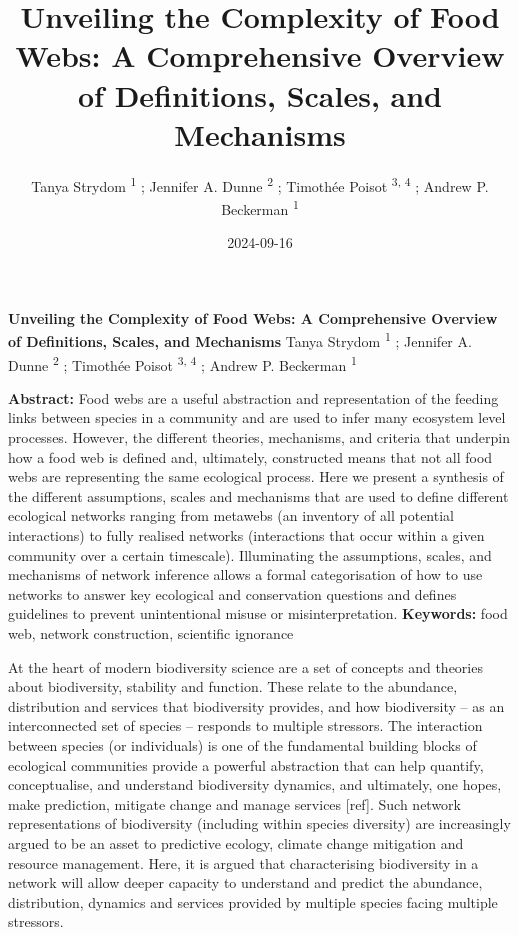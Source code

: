 \documentclass[
]{article}
\title{Unveiling the Complexity of Food Webs: A Comprehensive Overview
of Definitions, Scales, and Mechanisms}
\author{Tanya Strydom %
%
\textsuperscript{%
%
1%
}%
; Jennifer A. Dunne %
%
\textsuperscript{%
%
2%
}%
; Timothée Poisot %
%
\textsuperscript{%
3,%
4%
}%
; Andrew P. Beckerman %
%
\textsuperscript{%
%
1%
}%
}
\date{2024-09-16}
\begin{document}
\thispagestyle{empty}
{\bfseries\sffamily\Large Unveiling the Complexity of Food Webs: A
Comprehensive Overview of Definitions, Scales, and Mechanisms}
\vfil
Tanya Strydom %
%
\textsuperscript{%
%
1%
}%
; Jennifer A. Dunne %
%
\textsuperscript{%
%
2%
}%
; Timothée Poisot %
%
\textsuperscript{%
3,%
4%
}%
; Andrew P. Beckerman %
%
\textsuperscript{%
%
1%
}%

\vfil
{\small
\textbf{Abstract:} Food webs are a useful abstraction and representation
of the feeding links between species in a community and are used to
infer many ecosystem level processes. However, the different theories,
mechanisms, and criteria that underpin how a food web is defined and,
ultimately, constructed means that not all food webs are representing
the same ecological process. Here we present a synthesis of the
different assumptions, scales and mechanisms that are used to define
different ecological networks ranging from metawebs (an inventory of all
potential interactions) to fully realised networks (interactions that
occur within a given community over a certain timescale). Illuminating
the assumptions, scales, and mechanisms of network inference allows a
formal categorisation of how to use networks to answer key ecological
and conservation questions and defines guidelines to prevent
unintentional misuse or misinterpretation.
\vfil
\textbf{Keywords:} %
food web, network construction, %
scientific ignorance%
}
\clearpage
\setcounter{page}{1}
\doublespacing
\linenumbers


At the heart of modern biodiversity science are a set of concepts and
theories about biodiversity, stability and function. These relate to the
abundance, distribution and services that biodiversity provides, and how
biodiversity -- as an interconnected set of species -- responds to
multiple stressors. The interaction between species (or individuals) is
one of the fundamental building blocks of ecological communities provide
a powerful abstraction that can help quantify, conceptualise, and
understand biodiversity dynamics, and ultimately, one hopes, make
prediction, mitigate change and manage services {[}ref{]}. Such network
representations of biodiversity (including within species diversity) are
increasingly argued to be an asset to predictive ecology, climate change
mitigation and resource management. Here, it is argued that
characterising biodiversity in a network will allow deeper capacity to
understand and predict the abundance, distribution, dynamics and
services provided by multiple species facing multiple stressors.
\end{document}
